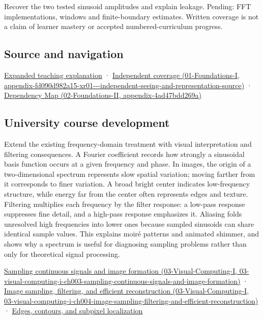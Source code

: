 Recover the two tested sinusoid amplitudes and explain leakage. Pending: FFT implementations, windows and finite-boundary estimates. Written coverage is not a claim of learner mastery or accepted numbered-curriculum progress.

\subsection{Source and navigation}\label{appendix-b60686ba06a1-source-and-navigation}

\hyperref[04-visual-computing-ii-ch042-fourier-coordinates-reveal-what-a-filter-removes]{Expanded teaching explanation} · \href{../01-Foundations-I/main.pdf\#nameddest=appendix-fd090d982a15-xr01---independent-seeing-and-representation-source}{Independent coverage (01-Foundations-I, appendix-fd090d982a15-xr01-\/-\/-independent-seeing-and-representation-source)} · \href{../02-Foundations-II/main.pdf\#nameddest=appendix-4ad47bdd269a}{Dependency Map (02-Foundations-II, appendix-4ad47bdd269a)}

\subsection{University course development}\label{appendix-b60686ba06a1-university-course-development}

Extend the existing frequency-domain treatment with visual interpretation and filtering consequences. A Fourier coefficient records how strongly a sinusoidal basis function occurs at a given frequency and phase. In images, the origin of a two-dimensional spectrum represents slow spatial variation; moving farther from it corresponds to finer variation. A broad bright center indicates low-frequency structure, while energy far from the center often represents edges and texture. Filtering multiplies each frequency by the filter response: a low-pass response suppresses fine detail, and a high-pass response emphasizes it. Aliasing folds unresolved high frequencies into lower ones because sampled sinusoids can share identical sample values. This explains moiré patterns and animated shimmer, and shows why a spectrum is useful for diagnosing sampling problems rather than only for theoretical signal processing.

\href{../03-Visual-Computing-I/main.pdf\#nameddest=03-visual-computing-i-ch003-sampling-continuous-signals-and-image-formation}{Sampling continuous signals and image formation (03-Visual-Computing-I, 03-visual-computing-i-ch003-sampling-continuous-signals-and-image-formation)} · \href{../03-Visual-Computing-I/main.pdf\#nameddest=03-visual-computing-i-ch004-image-sampling-filtering-and-efficient-reconstruction}{Image sampling, filtering, and efficient reconstruction (03-Visual-Computing-I, 03-visual-computing-i-ch004-image-sampling-filtering-and-efficient-reconstruction)} · \hyperref[04-visual-computing-ii-ch030-edges-contours-and-subpixel-localization]{Edges, contours, and subpixel localization}
